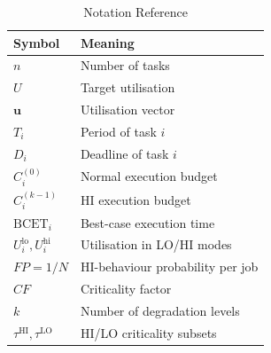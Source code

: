 \documentclass{article}
\begin{document}
\begin{table}[h]
\centering
\caption{Notation Reference}
\begin{tabular}{ll}
\toprule
Symbol & Meaning \\
\midrule
$n$ & Number of tasks \\
$U$ & Target utilisation \\
$\mathbf{u}$ & Utilisation vector \\
$T_i$ & Period of task $i$ \\
$D_i$ & Deadline of task $i$ \\
$C_i^{(0)}$ & Normal execution budget \\
$C_i^{(k-1)}$ & HI execution budget \\
$\mathrm{BCET}_i$ & Best-case execution time \\
$U_i^{\mathrm{lo}}, U_i^{\mathrm{hi}}$ & Utilisation in LO/HI modes \\
$FP = 1/N$ & HI-behaviour probability per job \\
$CF$ & Criticality factor \\
$k$ & Number of degradation levels \\
$\tau^{\mathrm{HI}}, \tau^{\mathrm{LO}}$ & HI/LO criticality subsets \\
\bottomrule
\end{tabular}
\end{table}



\end{document}
